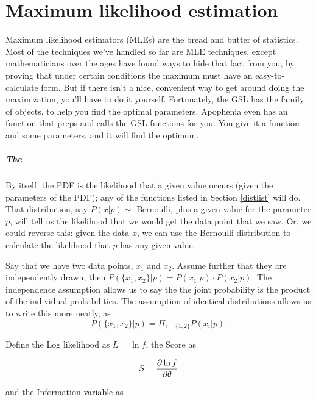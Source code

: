 \chapter{Maximum likelihood estimation} \label{mle}

Maximum likelihood estimators (MLEs) are the bread and butter of
statistics. Most of the techniques we've handled so far are MLE
techniques, except mathematicians over the ages have found ways to hide
that fact from you, by proving that under certain conditions the
maximum must have an easy-to-calculate form. But if there isn't a nice,
convenient way to get around doing the maximization, you'll have to do
it yourself. Fortunately, the GSL has the  family
of objects, to help you find the optimal parameters. Apophenia even
has an  function that preps and calls
the GSL functions for you. You give it a function and some parameters,
and it will find the optimum.

\paragraph{The }	\label{the score}
By itself, the PDF is the likelihood that a given value occurs (given
the parameters of the PDF); any of the functions listed in Section
\ref{distlist} will do. That distribution, say $P(x|p)\sim$ Bernoulli,
plus a given value for the parameter $p$, will tell us the likelihood
that we would get the data point that we saw. Or, we could reverse this:
given the data $x$, we can use the Bernoulli distribution to calculate the
likelihood that $p$ has any given value.

Say that we have two data points, $x_1$ and $x_2$. Assume further that
they are independently drawn; then $P(\{x_1,x_2\}|p)=P(x_1|p)\cdot P(x_2|p)$. 
The independence assumption allows us to say the the joint probability
is the product of the individual probabilities. The assumption of
identical distributions allows us to write this more neatly, as 
$$P(\{x_1,x_2\}|p)=\Pi_{i=\{1,2\}}P(x_i|p).$$

Define the Log likelihood as $L=\ln f$, the Score as

$$S={\partial \ln f\over \partial \theta}$$ 

and the Information variable as

